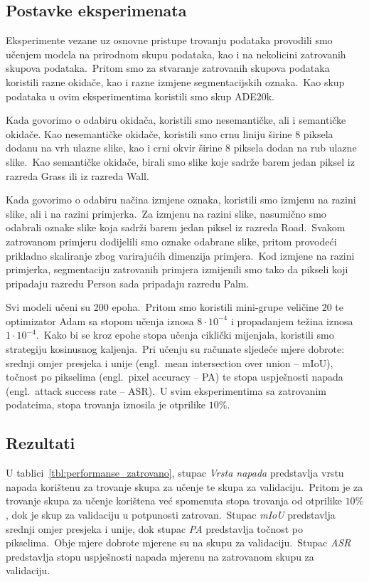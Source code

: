 \documentclass[times, utf8, seminar, numeric]{fer}
\begin{document}
\subsection{Postavke eksperimenata}

Eksperimente vezane uz osnovne pristupe trovanju podataka provodili smo učenjem modela na prirodnom skupu podataka, kao i na nekolicini zatrovanih skupova podataka.\ 
Pritom smo za stvaranje zatrovanih skupova podataka koristili razne okidače, kao i razne izmjene segmentacijskih oznaka.\ Kao skup podataka u ovim eksperimentima koristili smo skup ADE20k.\ 
  
Kada govorimo o odabiru okidača, koristili smo nesemantičke, ali i semantičke okidače.
Kao nesemantičke okidače, koristili smo crnu liniju širine 8 piksela dodanu na vrh ulazne slike, kao i crni okvir širine 8 piksela dodan na rub ulazne slike.\ 
Kao semantičke okidače, birali smo slike koje sadrže barem jedan piksel iz razreda Grass ili iz razreda Wall.\ 
  
Kada govorimo o odabiru načina izmjene oznaka, koristili smo izmjenu na razini slike, ali i na razini primjerka.\ 
Za izmjenu na razini slike, nasumično smo odabrali oznake slike koja sadrži barem jedan piksel iz razreda Road.\ 
Svakom zatrovanom primjeru dodijelili smo oznake odabrane slike, pritom provodeći prikladno skaliranje zbog varirajućih dimenzija primjera.\ 
Kod izmjene na razini primjerka, segmentaciju zatrovanih primjera izmijenili smo tako da pikseli koji pripadaju razredu Person sada pripadaju razredu Palm.
  
Svi modeli učeni su 200 epoha.\ Pritom smo koristili mini-grupe veličine 20 te optimizator Adam sa stopom učenja iznosa $8 \cdot 10^{-4}$ i propadanjem težina iznosa $1 \cdot 10^{-4}$.\
Kako bi se kroz epohe stopa učenja ciklički mijenjala, koristili smo strategiju kosinusnog kaljenja.\ 
Pri učenju su računate sljedeće mjere dobrote: srednji omjer presjeka i unije (engl.\ mean intersection over union – mIoU), točnost po pikselima (engl.\ pixel accuracy – PA) te stopa uspješnosti napada (engl.\ attack success rate – ASR).\ 
U svim eksperimentima sa zatrovanim podatcima, stopa trovanja iznosila je otprilike $10\%$. 

\subsection{Rezultati}

U tablici~\ref{tbl:performanse_zatrovano}, stupac \textit{Vrsta napada} predstavlja vrstu napada korištenu za trovanje skupa za učenje te skupa za validaciju.\ 
Pritom je za trovanje skupa za učenje korištena već spomenuta stopa trovanja od otprilike $10\%$, dok je skup za validaciju u potpunosti zatrovan.\ 
Stupac \textit{mIoU} predstavlja srednji omjer presjeka i unije, dok stupac \textit{PA} predstavlja točnost po pikselima.\ Obje mjere dobrote mjerene su na skupu za validaciju.\ 
Stupac \textit{ASR} predstavlja stopu uspješnosti napada mjerenu na zatrovanom skupu za validaciju.\
\end{document}
